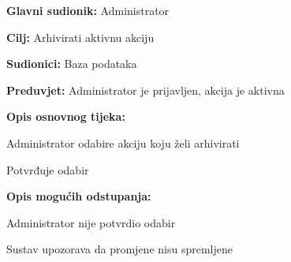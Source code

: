 					
					\noindent {}
					\begin{packed_item}
						
						\item \textbf{Glavni sudionik: }Administrator
						\item  \textbf{Cilj:} Arhivirati aktivnu akciju
						\item  \textbf{Sudionici:} Baza podataka
						\item  \textbf{Preduvjet:} Administrator je prijavljen, akcija je aktivna
						\item  \textbf{Opis osnovnog tijeka:}
						
						\item[] \begin{packed_enum}
							
							\item Administrator odabire akciju koju želi arhivirati
							\item Potvrđuje odabir
						\end{packed_enum}
						
						\item  \textbf{Opis mogućih odstupanja:}
						
						\item[] \begin{packed_item}
							
							\item[2.a] Administrator nije potvrdio odabir
							\item[] \begin{packed_enum}
								
								\item Sustav upozorava da promjene nisu spremljene
								
							\end{packed_enum}		
							
						\end{packed_item}
					\end{packed_item}
					

